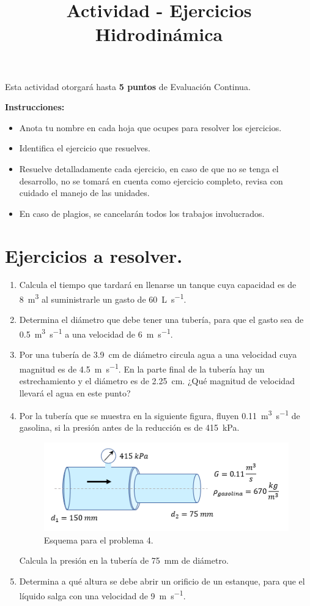 \documentclass[14pt]{extarticle}
\title{\vspace*{-2cm} Actividad - Ejercicios Hidrodinámica \vspace{-5ex}}
\date{}
\begin{document}
\maketitle

Esta actividad otorgará hasta \textbf{5 puntos} de Evaluación Continua.
\vspace*{0.5cm}

\textbf{Instrucciones: }
\begin{itemize}
\item Anota tu nombre en cada hoja que ocupes para resolver los ejercicios.
\item Identifica el ejercicio que resuelves.
\item Resuelve detalladamente cada ejercicio, en caso de que no se tenga el desarrollo, no se tomará en cuenta como ejercicio completo, revisa con cuidado el manejo de las unidades.
\item En caso de plagios, se cancelarán todos los trabajos involucrados.
\end{itemize}


\section*{Ejercicios a resolver.}

\begin{enumerate}
\item Calcula el tiempo que tardará en llenarse un tanque cuya capacidad es de \SI{8}{\cubic\meter} al suministrarle un gasto de \SI{60}{\liter\per\second}.
\item Determina el diámetro que debe tener una tubería, para que el gasto sea de \SI{0.5}{\cubic\meter\per\second} a una velocidad de \SI{6}{\meter\per\second}.
\item Por una tubería de \SI{3.9}{\centi\meter} de diámetro circula agua a una velocidad cuya magnitud es de \SI{4.5}{\meter\per\second}. En la parte final de la tubería hay un estrechamiento y el diámetro es de \SI{2.25}{\centi\meter}. ¿Qué magnitud de velocidad llevará el agua en este punto?
\item Por la tubería que se muestra en la siguiente figura, fluyen \SI{0.11}{\cubic\meter\per\second} de gasolina, si la presión antes de la reducción es de \SI{415}{\kilo\pascal}.
\begin{figure}[H]
    \centering
    \includegraphics{Imagenes/Problema_02.png}
    \caption{Esquema para el problema 4.}
\end{figure}
Calcula la presión en la tubería de \SI{75}{\milli\meter} de diámetro.
\item Determina a qué altura se debe abrir un orificio de un estanque, para que el líquido salga con una velocidad de \SI{9}{\meter\per\second}.
\end{enumerate}
\end{document}
